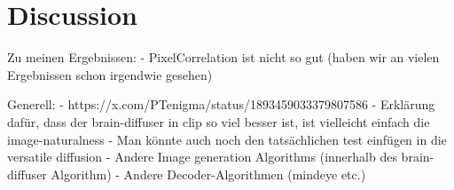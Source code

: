 \chapter{Discussion}


Zu meinen Ergebnissen:
- PixelCorrelation ist nicht so gut (haben wir an vielen Ergebnissen schon irgendwie gesehen)


Generell:
- https://x.com/PTenigma/status/1893459033379807586
- Erklärung dafür, dass der brain-diffuser in clip so viel besser ist, ist vielleicht einfach die image-naturalness
- Man könnte auch noch den tatsächlichen test einfügen in die versatile diffusion
- Andere Image generation Algorithms (innerhalb des brain-diffuser Algorithm)
- Andere Decoder-Algorithmen (mindeye etc.)
